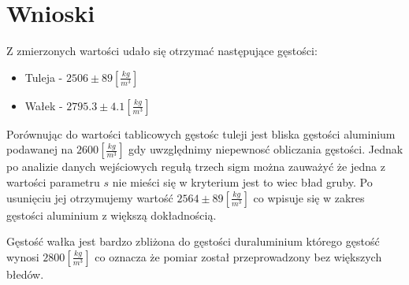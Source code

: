 \documentclass[11pt]{article}
\begin{document}
    \section{Wnioski}
    Z zmierzonych wartości udało się otrzymać następujące gęstości:
    \begin{itemize}
        \item Tuleja - $2506\pm 89[\frac{kg}{m^3}]$
        \item Wałek - $2795.3\pm 4.1 [\frac{kg}{m^3}]$
    \end{itemize}
    \par{\noindent Porównując do wartości tablicowych gęstośc tuleji jest bliska gęstości aluminium podawanej na $2600[\frac{kg}{m^3}]$ gdy uwzględnimy niepewnosć obliczania gęstości.
    Jednak po analizie danych wejściowych regułą trzech sigm można zauważyć że jedna z wartości parametru $s$ nie mieści się w kryterium jest to wiec bład gruby.
    Po usunięciu jej otrzymujemy wartość $2564\pm 89[\frac{kg}{m^3}]$ co wpisuje się w zakres gęstości aluminium z większą dokładnością.}
    \vspace{1mm}
    \par{\noindent Gęstość wałka jest bardzo zbliżona do gęstości duraluminium którego gęstość wynosi $2800[\frac{kg}{m^3}]$ co oznacza że pomiar został przeprowadzony bez większych błedów.}
\end{document}

